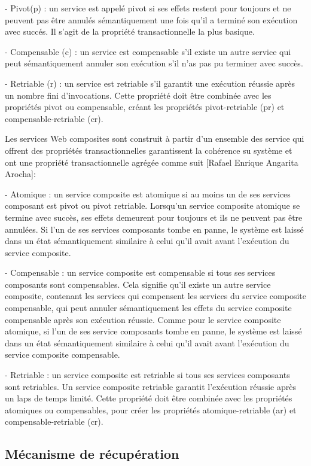  - Pivot(p) : un service est appelé pivot si ses effets restent pour toujours
et ne peuvent pas être annulés sémantiquement une fois qu’il a terminé son exécution avec succés. Il s’agit de la propriété transactionnelle la plus basique.

- Compensable (c) : un service est compensable s’il existe un autre service qui peut sémantiquement annuler son exécution s'il n'as pas pu terminer avec succès.  
 
- Retriable (r) : un service est retriable s’il garantit une exécution réussie après un nombre fini d’invocations. Cette propriété doit être combinée avec les propriétés pivot ou compensable, créant les propriétés pivot-retriable (pr) et compensable-retriable (cr).

Les services Web composites sont construit à partir d'un ensemble des service qui offrent des propriétés transactionnelles garantissent la cohérence su système et ont une propriété transactionnelle agrégée comme suit [Rafael Enrique Angarita Arocha]: 

- Atomique : un service composite est atomique si au moins un de ses services composant est pivot ou pivot retriable. Lorsqu’un service composite atomique se termine avec succès, ses effets demeurent pour toujours et ils ne peuvent pas être annulées. Si l’un de ses services composants tombe en panne, le système est laissé dans un état sémantiquement similaire à celui qu’il avait avant l’exécution du service composite.


- Compensable : un service composite est compensable si tous ses services composants sont compensables. Cela signifie qu’il existe un autre service composite, contenant les services qui compensent les services du service composite compensable, qui peut annuler sémantiquement les effets du service composite compensable après son exécution réussie. Comme pour le service composite atomique, si l’un de ses service composants tombe en panne, le système est laissé dans un état sémantiquement similaire à celui qu’il avait avant l’exécution du service composite compensable.


- Retriable : un service composite est retriable si tous ses services composants sont retriables. Un service composite retriable garantit l’exécution réussie après un laps de temps limité. Cette propriété doit être combinée avec les propriétés atomiques ou compensables, pour créer les propriétés atomique-retriable (ar) et compensable-retriable (cr).


\subsection{Mécanisme de récupération}

